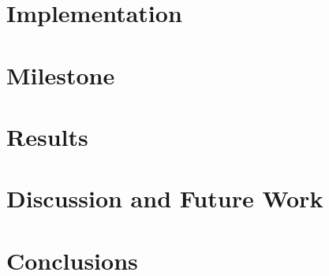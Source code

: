 \documentclass{article}
\begin{document}
\section{Implementation}

\section{Milestone}

\section{Results}

\section{Discussion and Future Work}


\section{Conclusions}

\printbibliography[heading=bibintoc, title={Bibliography}]
\end{document}
